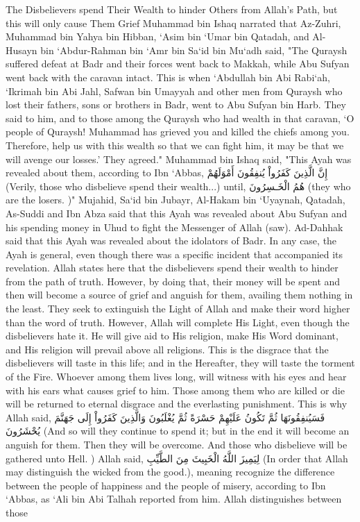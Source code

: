 \documentclass[11pt,a4paper,openany]{book}
\let\textAR\textarabic
\begin{document}
\begin{tafsirbox}
The Disbelievers spend Their Wealth to hinder Others from Allah's Path, but this will only cause Them Grief Muhammad bin Ishaq narrated that Az-Zuhri, Muhammad bin Yahya bin Hibban, `Asim bin `Umar bin Qatadah, and Al-Husayn bin `Abdur-Rahman bin `Amr bin Sa`id bin Mu`adh said, "The Quraysh suffered defeat at Badr and their forces went back to Makkah, while Abu Sufyan went back with the caravan intact. This is when `Abdullah bin Abi Rabi`ah, `Ikrimah bin Abi Jahl, Safwan bin Umayyah and other men from Quraysh who lost their fathers, sons or brothers in Badr, went to Abu Sufyan bin Harb. They said to him, and to those among the Quraysh who had wealth in that caravan, `O people of Quraysh! Muhammad has grieved you and killed the chiefs among you. Therefore, help us with this wealth so that we can fight him, it may be that we will avenge our losses.' They agreed." Muhammad bin Ishaq said, "This Ayah was revealed about them, according to Ibn `Abbas, \textAR{إِنَّ} \textAR{الَّذِينَ} \textAR{كَفَرُواْ} \textAR{يُنفِقُونَ} \textAR{أَمْوَلَهُمْ} (Verily, those who disbelieve spend their wealth...) until, \textAR{هُمُ} \textAR{الْخَـسِرُونَ} (they who are the losers. )" Mujahid, Sa`id bin Jubayr, Al-Hakam bin `Uyaynah, Qatadah, As-Suddi and Ibn Abza said that this Ayah was revealed about Abu Sufyan and his spending money in Uhud to fight the Messenger of Allah (saw). Ad-Dahhak said that this Ayah was revealed about the idolators of Badr. In any case, the Ayah is general, even though there was a specific incident that accompanied its revelation. Allah states here that the disbelievers spend their wealth to hinder from the path of truth. However, by doing that, their money will be spent and then will become a source of grief and anguish for them, availing them nothing in the least. They seek to extinguish the Light of Allah and make their word higher than the word of truth. However, Allah will complete His Light, even though the disbelievers hate it. He will give aid to His religion, make His Word dominant, and His religion will prevail above all religions. This is the disgrace that the disbelievers will taste in this life; and in the Hereafter, they will taste the torment of the Fire. Whoever among them lives long, will witness with his eyes and hear with his ears what causes grief to him. Those among them who are killed or die will be returned to eternal disgrace and the everlasting punishment. This is why Allah said, \textAR{فَسَيُنفِقُونَهَا} \textAR{ثُمَّ} \textAR{تَكُونُ} \textAR{عَلَيْهِمْ} \textAR{حَسْرَةً} \textAR{ثُمَّ} \textAR{يُغْلَبُونَ} \textAR{وَالَّذِينَ} \textAR{كَفَرُواْ} \textAR{إِلَى} \textAR{جَهَنَّمَ} \textAR{يُحْشَرُونَ} (And so will they continue to spend it; but in the end it will become an anguish for them. Then they will be overcome. And those who disbelieve will be gathered unto Hell. ) Allah said, \textAR{لِيَمِيزَ} \textAR{اللَّهُ} \textAR{الْخَبِيثَ} \textAR{مِنَ} \textAR{الطَّيِّبِ} (In order that Allah may distinguish the wicked from the good.), meaning recognize the difference between the people of happiness and the people of misery, according to Ibn `Abbas, as `Ali bin Abi Talhah reported from him. Allah distinguishes between those 
\end{tafsirbox}
\end{document}
